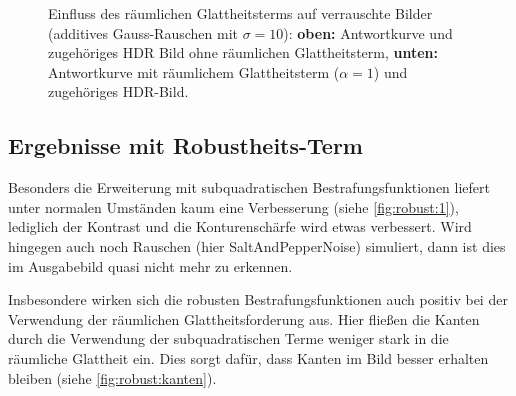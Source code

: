 \begin{figure}
  \begin{center}
    
    \caption{Einfluss des räumlichen Glattheitsterms auf verrauschte Bilder (additives Gauss-Rauschen mit $\sigma = 10$): \textbf{oben:} Antwortkurve und zugehöriges HDR Bild ohne räumlichen Glattheitsterm, \textbf{unten:} Antwortkurve mit räumlichem Glattheitsterm ($\alpha = 1$) und zugehöriges HDR-Bild.}
    \label{fig:raum:1}
  \end{center}
\end{figure}

\subsection{Ergebnisse mit Robustheits-Term}

Besonders die Erweiterung mit subquadratischen Bestrafungsfunktionen liefert unter normalen Umständen kaum eine Verbesserung (siehe \autoref{fig:robust:1}), lediglich der Kontrast und die Konturenschärfe wird etwas verbessert. Wird hingegen auch noch Rauschen (hier \gls{SaltAndPepperNoise}) simuliert, dann ist dies im Ausgabebild quasi nicht mehr zu erkennen. 

Insbesondere wirken sich die robusten Bestrafungsfunktionen auch positiv bei der Verwendung der räumlichen Glattheitsforderung aus. Hier fließen die Kanten durch die Verwendung der subquadratischen Terme weniger stark in die räumliche Glattheit ein. Dies sorgt dafür, dass Kanten im Bild besser erhalten bleiben (siehe \autoref{fig:robust:kanten}).


